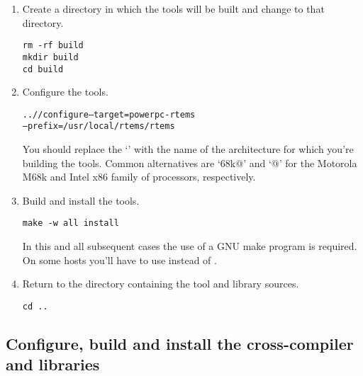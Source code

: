 \documentclass{report}
\begin{document}
\begin{enumerate}
\item Create a directory in which the tools will be built and
change to that directory.
\begin{verbatim}
rm -rf build
mkdir build
cd build
\end{verbatim}

\item Configure the tools.
\begin{alltt}
../\BINUTILS/configure --target=powerpc-rtems\rtemsVersion \verb@\@
             --prefix=/usr/local/rtems/rtems\rtemsVersion
\end{alltt}
You should replace the `\verb@powerpc@' with the name of the architecture
for which you're
building the tools.  Common alternatives are `\verb@m68k@' and `@' for
the Motorola M68k and Intel x86 family of processors, respectively.

\item Build and install the tools.
\begin{verbatim}
make -w all install
\end{verbatim}
In this and all subsequent cases the use of a GNU make program is required.
On some hosts you'll have to use \verb@gmake@ instead of \verb@make@.

\item Return to the directory containing the tool and library sources.
\begin{verbatim}
cd ..
\end{verbatim}
\end{enumerate}

\subsection {Configure, build and install the cross-compiler and libraries}
\end{document}
